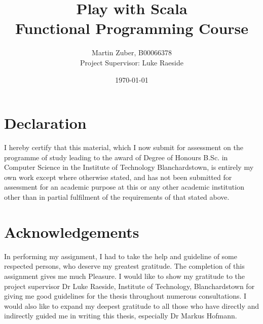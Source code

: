 \documentclass[12pt,twoside,a4paper]{report}
\title{Play with Scala\\Functional Programming Course}
\author{Martin Zuber, B00066378 \\ Project Supervisor:  Luke Raeside}
\date{\today}
\begin{document}
\maketitle
\newpage

\chapter*{Declaration}
I hereby certify that this material, which I now submit for assessment on the programme of study leading to the award of Degree of Honours B.Sc. in Computer Science in the Institute of Technology Blanchardstown, is entirely my own work except where otherwise stated, and has not been submitted for assessment for an academic purpose at this or any other academic institution other than in partial fulfilment of the requirements of that stated above.

\chapter*{Acknowledgements}
In performing my assignment, I had to take the help and guideline of some respected persons, who deserve my greatest gratitude. The completion of this assignment gives me much Pleasure. I would like to show my gratitude to the project supervisor Dr Luke Raeside, Institute of Technology, Blanchardstown for giving me good guidelines for the thesis throughout numerous consultations. I would also like to expand my deepest gratitude to all those who have directly and indirectly guided me in writing this thesis, especially Dr Markus Hofmann.

\end{document}
